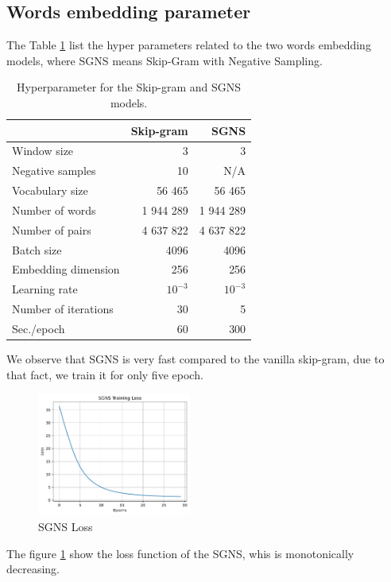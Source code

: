    \subsection{Words embedding parameter}
   The Table \ref{tab:hyperparameters} list the hyper parameters related to the two words embedding models, where SGNS means Skip-Gram with Negative Sampling.
   \begin{table}[H]
    \centering
    \begin{tabular}{lrr}
        \toprule
        & Skip-gram & SGNS \\
        \midrule
        Window size & 3 & 3 \\
        Negative samples & 10 & N/A \\
        Vocabulary size & 56 465 & 56 465 \\
		Number of words & 1 944 289 & 1 944 289\\
		Number of pairs &4 637 822& 4 637 822\\
		Batch size &4096&4096\\
        Embedding dimension & 256 & 256 \\
        Learning rate & $10^{-3}$ & $10^{-3}$ \\
        Number of iterations & 30 & 5 \\
        Sec./epoch & 60 & 300 \\
        \bottomrule
    \end{tabular}
    \caption{Hyperparameter for the Skip-gram and SGNS models.}
    \label{tab:hyperparameters}
\end{table}
We observe that SGNS is very fast compared to the vanilla skip-gram, due to that fact, we train it for only five epoch.
\begin{figure}[H]\centering
	\includegraphics[width=0.45\textwidth]{figures/sgns_loss.pdf}
	\caption{SGNS Loss}
	\label{fig:loss}
\end{figure}
The figure \ref{fig:loss} show the loss function of the SGNS, whis is monotonically decreasing. 
